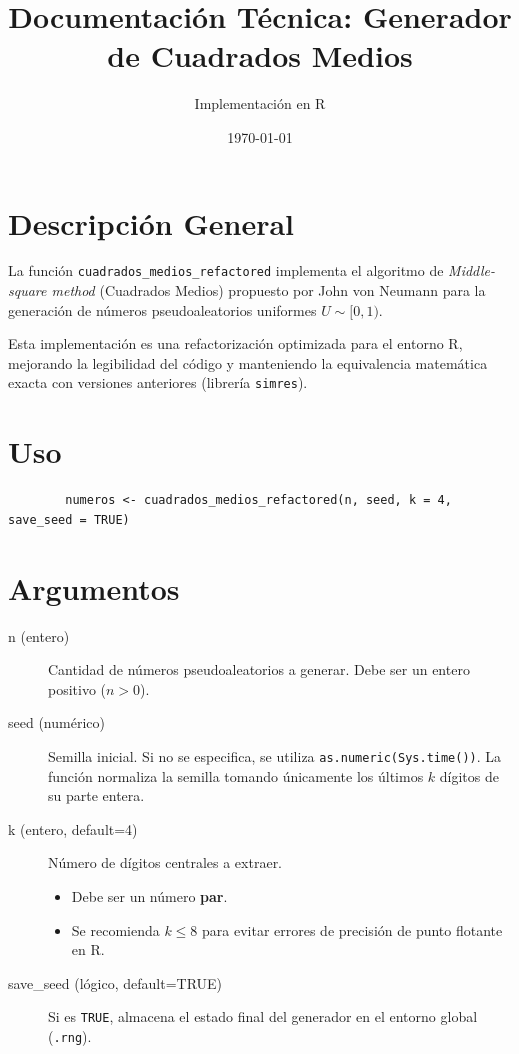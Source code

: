 \documentclass[a4paper,11pt]{article}
\title{\textbf{Documentación Técnica: Generador de Cuadrados Medios}}
\author{Implementación en R}
\date{\today}
\begin{document}
	
	\maketitle
	
	\section{Descripción General}
	La función \texttt{cuadrados\_medios\_refactored} implementa el algoritmo de \textit{Middle-square method} (Cuadrados Medios) propuesto por John von Neumann para la generación de números pseudoaleatorios uniformes $U \sim [0, 1)$.
	
	Esta implementación es una refactorización optimizada para el entorno R, mejorando la legibilidad del código y manteniendo la equivalencia matemática exacta con versiones anteriores (librería \texttt{simres}).
	
	\section{Uso}
	\begin{lstlisting}
		numeros <- cuadrados_medios_refactored(n, seed, k = 4, save_seed = TRUE)
	\end{lstlisting}
	
	\section{Argumentos}
	\begin{description}
		\item[n (entero)] Cantidad de números pseudoaleatorios a generar. Debe ser un entero positivo ($n > 0$).
		
		\item[seed (numérico)] Semilla inicial. Si no se especifica, se utiliza \texttt{as.numeric(Sys.time())}. La función normaliza la semilla tomando únicamente los últimos $k$ dígitos de su parte entera.
		
		\item[k (entero, default=4)] Número de dígitos centrales a extraer. 
		\begin{itemize}
			\item Debe ser un número \textbf{par}.
			\item Se recomienda $k \leq 8$ para evitar errores de precisión de punto flotante en R.
		\end{itemize}
		
		\item[save\_seed (lógico, default=TRUE)] Si es \texttt{TRUE}, almacena el estado final del generador en el entorno global (\texttt{.rng}).
	\end{description}
	
\end{document}
